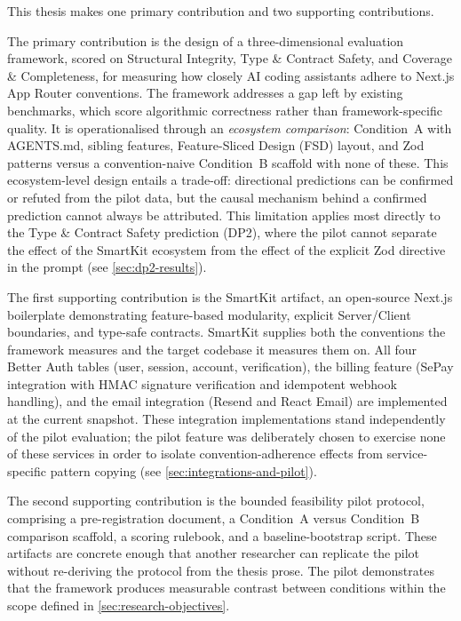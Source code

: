 \documentclass[12pt,a4paper]{report}
\begin{document}
This thesis makes one primary contribution and two supporting contributions.

The primary contribution is the design of a three-dimensional evaluation framework, scored on Structural Integrity, Type \& Contract Safety, and Coverage \& Completeness, for measuring how closely AI coding assistants adhere to Next.js App Router conventions. The framework addresses a gap left by existing benchmarks, which score algorithmic correctness rather than framework-specific quality. It is operationalised through an \emph{ecosystem comparison}: Condition~A with AGENTS.md, sibling features, Feature-Sliced Design (FSD) layout, and Zod patterns versus a convention-naive Condition~B scaffold with none of these. This ecosystem-level design entails a trade-off: directional predictions can be confirmed or refuted from the pilot data, but the causal mechanism behind a confirmed prediction cannot always be attributed. This limitation applies most directly to the Type \& Contract Safety prediction (DP2), where the pilot cannot separate the effect of the SmartKit ecosystem from the effect of the explicit Zod directive in the prompt (see \autoref{sec:dp2-results}).

The first supporting contribution is the SmartKit artifact, an open-source Next.js boilerplate demonstrating feature-based modularity, explicit Server/Client boundaries, and type-safe contracts. SmartKit supplies both the conventions the framework measures and the target codebase it measures them on. All four Better Auth tables (user, session, account, verification), the billing feature (SePay integration with HMAC signature verification and idempotent webhook handling), and the email integration (Resend and React Email) are implemented at the current snapshot. These integration implementations stand independently of the pilot evaluation; the pilot feature was deliberately chosen to exercise none of these services in order to isolate convention-adherence effects from service-specific pattern copying (see \autoref{sec:integrations-and-pilot}).

The second supporting contribution is the bounded feasibility pilot protocol, comprising a pre-registration document, a Condition~A versus Condition~B comparison scaffold, a scoring rulebook, and a baseline-bootstrap script. These artifacts are concrete enough that another researcher can replicate the pilot without re-deriving the protocol from the thesis prose. The pilot demonstrates that the framework produces measurable contrast between conditions within the scope defined in \autoref{sec:research-objectives}.
\end{document}
